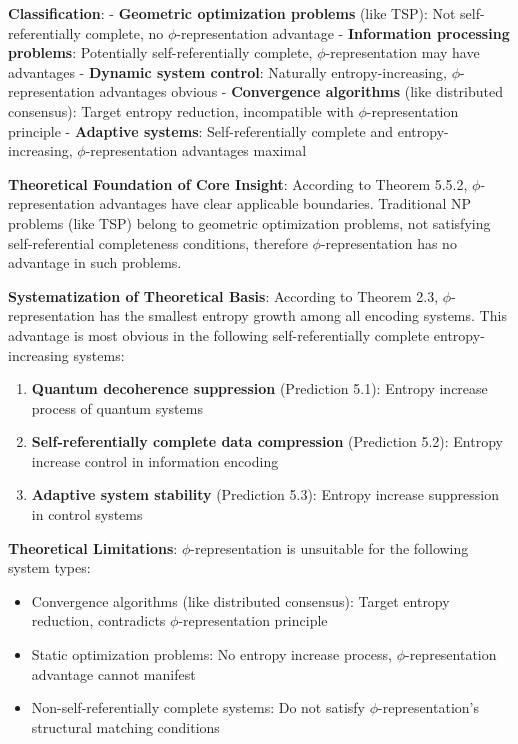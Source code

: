    \textbf{Classification}:
   - \textbf{Geometric optimization problems} (like TSP): Not self-referentially complete, no $\phi$-representation advantage
   - \textbf{Information processing problems}: Potentially self-referentially complete, $\phi$-representation may have advantages
   - \textbf{Dynamic system control}: Naturally entropy-increasing, $\phi$-representation advantages obvious
   - \textbf{Convergence algorithms} (like distributed consensus): Target entropy reduction, incompatible with $\phi$-representation principle
   - \textbf{Adaptive systems}: Self-referentially complete and entropy-increasing, $\phi$-representation advantages maximal

\textbf{Theoretical Foundation of Core Insight}:
According to Theorem 5.5.2, $\phi$-representation advantages have clear applicable boundaries. Traditional NP problems (like TSP) belong to geometric optimization problems, not satisfying self-referential completeness conditions, therefore $\phi$-representation has no advantage in such problems.

\textbf{Systematization of Theoretical Basis}:
According to Theorem 2.3, $\phi$-representation has the smallest entropy growth among all encoding systems. This advantage is most obvious in the following self-referentially complete entropy-increasing systems:

\begin{enumerate}
\item \textbf{Quantum decoherence suppression} (Prediction 5.1): Entropy increase process of quantum systems
\item \textbf{Self-referentially complete data compression} (Prediction 5.2): Entropy increase control in information encoding
\item \textbf{Adaptive system stability} (Prediction 5.3): Entropy increase suppression in control systems
\end{enumerate}

\textbf{Theoretical Limitations}:
$\phi$-representation is unsuitable for the following system types:
\begin{itemize}
\item Convergence algorithms (like distributed consensus): Target entropy reduction, contradicts $\phi$-representation principle
\item Static optimization problems: No entropy increase process, $\phi$-representation advantage cannot manifest
\item Non-self-referentially complete systems: Do not satisfy $\phi$-representation's structural matching conditions
\end{itemize}

